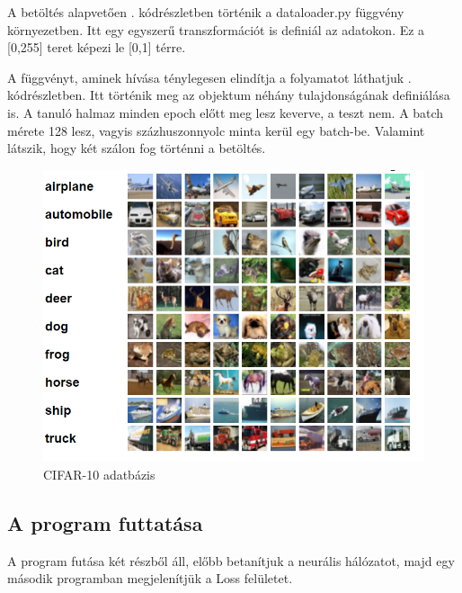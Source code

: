 \documentclass[twoside,a4paper]{refart}
\begin{document}
A betöltés alapvetően . kódrészletben történik a dataloader.py függvény környezetben. Itt egy egyszerű transzformációt is definiál az adatokon. Ez a [0,255] teret képezi le [0,1] térre.

A függvényt, aminek hívása ténylegesen elindítja a folyamatot láthatjuk . kódrészletben. Itt történik meg az objektum néhány tulajdonságának definiálása is. A tanuló halmaz minden epoch előtt meg lesz keverve, a teszt nem. A batch mérete 128 lesz, vagyis százhuszonnyolc minta kerül egy batch-be. Valamint látszik, hogy két szálon fog történni a betöltés.

{\small }

\begin{figure}[th]
	\centering
	\includegraphics[width=0.6\linewidth]{image/CIFAR10}
	\caption[CIFAR-10]{CIFAR-10 adatbázis}
	\label{fig:cifar10}
\end{figure}


\subsection{A program futtatása}

A program futása két részből áll, előbb betanítjuk a neurális hálózatot, majd egy második programban megjelenítjük a Loss felületet.
\end{document}
